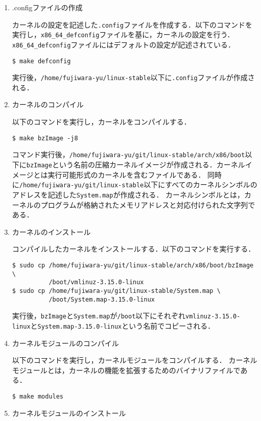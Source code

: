 \documentclass[12pt]{jsarticle}
\begin{document}
\begin{enumerate}
\item .configファイルの作成

カーネルの設定を記述した\verb|.config|ファイルを作成する．以下のコマンドを実行し，\verb|x86_64_defconfig|ファイルを基に，カーネルの設定を行う．\verb|x86_64_defconfig|ファイルにはデフォルトの設定が記述されている．
\begin{verbatim}
$ make defconfig
\end{verbatim}
実行後，\verb|/home/fujiwara-yu/linux-stable|以下に\verb|.config|ファイルが作成される．

\item カーネルのコンパイル

以下のコマンドを実行し，カーネルをコンパイルする．
\begin{verbatim}
$ make bzImage -j8
\end{verbatim}
コマンド実行後，\verb|/home/fujiwara-yu/git/linux-stable/arch/x86/boot|以下に\verb|bzImage|という名前の圧縮カーネルイメージが作成される．カーネルイメージとは実行可能形式のカーネルを含むファイルである．
同時に\verb|/home/fujiwara-yu/git/linux-stable|以下にすべてのカーネルシンボルのアドレスを記述した\verb|System.map|が作成される．
カーネルシンボルとは，カーネルのプログラムが格納されたメモリアドレスと対応付けられた文字列である．

\item カーネルのインストール

コンパイルしたカーネルをインストールする．以下のコマンドを実行する．
\begin{verbatim}
$ sudo cp /home/fujiwara-yu/git/linux-stable/arch/x86/boot/bzImage \
          /boot/vmlinuz-3.15.0-linux
$ sudo cp /home/fujiwara-yu/git/linux-stable/System.map \
          /boot/System.map-3.15.0-linux
\end{verbatim}
実行後，\verb|bzImage|と\verb|System.map|が\verb|/boot|以下にそれぞれ\verb|vmlinuz-3.15.0-linux|と\verb|System.map-3.15.0-linux|という名前でコピーされる．

\item カーネルモジュールのコンパイル

以下のコマンドを実行し，カーネルモジュールをコンパイルする．
カーネルモジュールとは，カーネルの機能を拡張するためのバイナリファイルである．
\begin{verbatim}
$ make modules
\end{verbatim}

\item カーネルモジュールのインストール


\end{enumerate}
\end{document}
